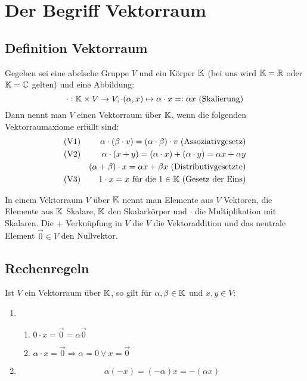 \section{Der Begriff Vektorraum}
\subsection{Definition Vektorraum}
Gegeben sei eine abelsche Gruppe $V$ und ein Körper $\mathbb{K}$ (bei uns wird $\mathbb{K}=\mathbb{R}$
oder $\mathbb{K}=\mathbb{C}$ gelten) und eine Abbildung:
\begin{equation*}
    \cdot: \mathbb{K} \times V \to V, \cdot(\alpha, x) \mapsto \alpha \cdot x =:
    \alpha x \text{ (Skalierung)}
\end{equation*}
Dann nennt man $V$ einen Vektorraum über $\mathbb{K}$, wenn die folgenden Vektorraumaxiome
erfüllt sind:
\begin{eqnarray*}
    &\text{(V1)}& \alpha \cdot (\beta \cdot v) = (\alpha \cdot \beta) \cdot v
    \text{ (Assoziativgesetz)}\\
    &\text{(V2)}& \alpha \cdot (x+y) = (\alpha \cdot x) + (\alpha \cdot y) =
    \alpha x + \alpha y \\
    && (\alpha + \beta) \cdot x = \alpha x + \beta x
    \text{ (Distributivgesetzte)}\\
    &\text{(V3)}& 1 \cdot x = x \text{ für die } 1 \in \mathbb{K} \text{ (Gesetz der Eins)}
\end{eqnarray*}

In einem Vektorraum $V$ über $\mathbb{K}$ nennt man Elemente aus $V$ Vektoren, die Elemente
aus $\mathbb{K}$ Skalare, $\mathbb{K}$ den Skalarkörper und \glqq{}$\cdot$\grqq{} die
Multiplikation mit Skalaren. Die \glqq{}$+$\grqq{} Verknüpfung in $V$ die $V$ die
Vektoraddition und das neutrale Element $\vec{0} \in V$ den Nullvektor.

\subsection{Rechenregeln}
Ist $V$ ein Vektorraum über $\mathbb{K}$, so gilt für $\alpha, \beta \in \mathbb{K}$ und
$x, y \in V$:
\begin{enumerate}
    \item
        \begin{enumerate}[label = (\alph*)]
            \item $0 \cdot x = \vec{0} = \alpha \vec{0}$
            \item $\alpha \cdot x = \vec{0} \Rightarrow \alpha = 0 \lor x=\vec{0}$
        \end{enumerate}
     \item
        \begin{equation*}
            \alpha (-x) = (-\alpha) x = - (\alpha x)
        \end{equation*}
\end{enumerate}

